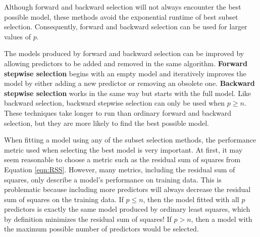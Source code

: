 \documentclass{article}
\begin{document}
Although forward and backward selection will not always encounter the best possible model, these methods avoid the exponential runtime of best subset selection. Consequently, forward and backward selection can be used for larger values of $p$.

The models produced by forward and backward selection can be improved by allowing predictors to be added and removed in the same algorithm. \textbf{Forward stepwise selection} begins with an empty model and iteratively improves the model by either adding a new predictor or removing an obsolete one. \textbf{Backward stepwise selection} works in the same way but starts with the full model. Like backward selection, backward stepwise selection can only be used when $p\geq n$. These techniques take longer to run than ordinary forward and backward selection, but they are more likely to find the best possible model.

When fitting a model using any of the subset selection methods, the performance metric used when selecting the best model is very important. At first, it may seem reasonable to choose a metric such as the residual sum of squares from Equation \ref{eqn:RSS}. However, many metrics, including the residual sum of squares, only describe a model's performance on training data. This is problematic because including more predictors will always decrease the residual sum of squares on the training data. If $p\leq n$, then the model fitted with all $p$ predictors is exactly the same model produced by ordinary least squares, which by definition minimizes the residual sum of squares! If $p>n$, then a model with the maximum possible number of predictors would be selected.
\end{document}
